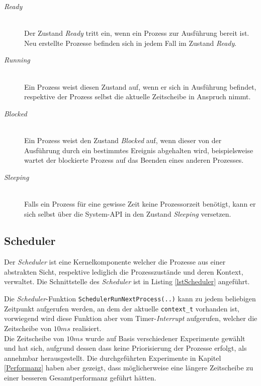 \begin{description}
	\item[\textit{Ready}] \hfill \\
	Der Zustand \textit{Ready} tritt ein, wenn ein Prozess zur Ausführung bereit ist. Neu erstellte Prozesse befinden sich in jedem Fall im Zustand \textit{Ready}.
	
	\item[\textit{Running}] \hfill \\
	Ein Prozess weist diesen Zustand auf, wenn er sich in Ausführung befindet, respektive der Prozess selbst die aktuelle Zeitscheibe in Anspruch nimmt.
	
	\item[\textit{Blocked}] \hfill \\
	Ein Prozess weist den Zustand \textit{Blocked} auf, wenn dieser von der Ausführung durch ein bestimmtes Ereignis abgehalten wird, beispielsweise wartet der blockierte Prozess auf das Beenden eines anderen Prozesses.
	
	\item[\textit{Sleeping}] \hfill \\
	Falls ein Prozess für eine gewisse Zeit keine Prozessorzeit benötigt, kann er sich selbst über die System-API in den Zustand \textit{Sleeping} versetzen.

\end{description}

\subsection{Scheduler}
\label{secScheduler}
Der \textit{Scheduler} ist eine Kernelkomponente welcher die Prozesse aus einer abstrakten Sicht, respektive lediglich die Prozesszustände und deren Kontext, verwaltet. Die Schnittstelle des \textit{Scheduler} ist in Listing \ref{lstScheduler} angeführt.



Die \textit{Scheduler}-Funktion \texttt{SchedulerRunNextProcess(..)} kann zu jedem beliebigen Zeitpunkt aufgerufen werden, an dem der aktuelle \texttt{context\_t} vorhanden ist, vorwiegend wird diese Funktion aber vom Timer-\textit{Interrupt} aufgerufen, welcher die Zeitscheibe von $10ms$ realisiert.\\
Die Zeitscheibe von $10ms$ wurde auf Basis verschiedener Experimente gewählt und hat sich, aufgrund dessen dass keine Priorisierung der Prozesse erfolgt, als annehmbar herausgestellt. Die durchgeführten Experimente in Kapitel \ref{Performanz} haben aber gezeigt, dass möglicherweise eine längere Zeitscheibe zu einer besseren Gesamtperformanz geführt hätten.


